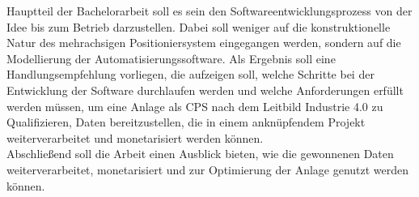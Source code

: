 \documentclass[12pt, a4paper, twoside]{article} %
\begin{document}
Hauptteil der Bachelorarbeit soll es sein den Softwareentwicklungsprozess von der Idee bis zum Betrieb darzustellen. Dabei soll weniger auf die konstruktionelle Natur des mehrachsigen Positioniersystem eingegangen werden, sondern auf die Modellierung der Automatisierungssoftware. Als Ergebnis soll eine Handlungsempfehlung vorliegen, die aufzeigen soll, welche Schritte bei der Entwicklung der Software durchlaufen werden und welche Anforderungen erfüllt werden müssen, um eine Anlage als CPS nach dem Leitbild Industrie 4.0 zu Qualifizieren, Daten bereitzustellen, die in einem anknüpfendem Projekt weiterverarbeitet und monetarisiert werden können.\\
Abschließend soll die Arbeit einen Ausblick bieten, wie die gewonnenen Daten weiterverarbeitet, monetarisiert und zur Optimierung der Anlage genutzt werden können.

\end{document}
